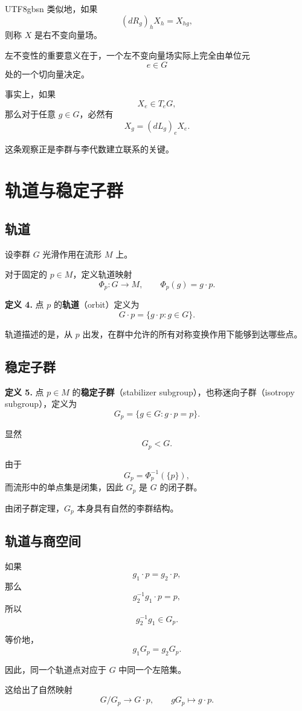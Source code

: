 \documentclass[11pt]{article}
\begin{document}
\begin{CJK*}{UTF8}{gbsn}
类似地，如果
\[
(dR_g)_hX_h
=
X_{hg},
\]
则称 $X$ 是右不变向量场。

左不变性的重要意义在于，一个左不变向量场实际上完全由单位元
\[
e\in G
\]
处的一个切向量决定。

事实上，如果
\[
X_e\in T_eG,
\]
那么对于任意 $g\in G$，必然有
\[
X_g
=
(dL_g)_eX_e.
\]

这条观察正是李群与李代数建立联系的关键。


\section{轨道与稳定子群}

\subsection{轨道}

设李群 $G$ 光滑作用在流形 $M$ 上。

对于固定的 $p\in M$，定义轨道映射
\[
\Phi_p:G\to M,
\qquad
\Phi_p(g)=g\cdot p.
\]

\textbf{定义 4.}
点 $p$ 的\textbf{轨道}（orbit）定义为
\[
G\cdot p
=
\{g\cdot p:g\in G\}.
\]

轨道描述的是，从 $p$ 出发，在群中允许的所有对称变换作用下能够到达哪些点。


\subsection{稳定子群}

\textbf{定义 5.}
点 $p\in M$ 的\textbf{稳定子群}（stabilizer subgroup），也称迷向子群（isotropy subgroup），定义为
\[
G_p
=
\{g\in G:g\cdot p=p\}.
\]

显然
\[
G_p<G.
\]

由于
\[
G_p=\Phi_p^{-1}(\{p\}),
\]
而流形中的单点集是闭集，因此 $G_p$ 是 $G$ 的闭子群。

由闭子群定理，$G_p$ 本身具有自然的李群结构。


\subsection{轨道与商空间}

如果
\[
g_1\cdot p=g_2\cdot p,
\]
那么
\[
g_2^{-1}g_1\cdot p=p,
\]
所以
\[
g_2^{-1}g_1\in G_p.
\]

等价地，
\[
g_1G_p=g_2G_p.
\]

因此，同一个轨道点对应于 $G$ 中同一个左陪集。

这给出了自然映射
\[
G/G_p\longrightarrow G\cdot p,
\qquad
gG_p\longmapsto g\cdot p.
\]


\end{CJK*}
\end{document}
